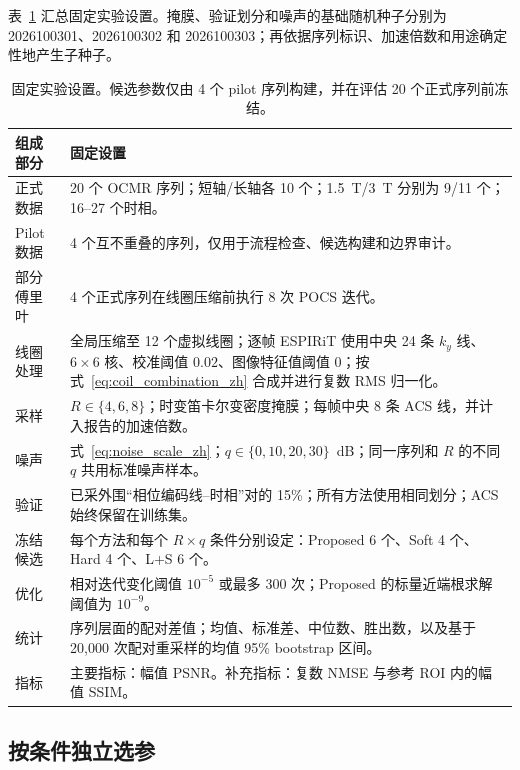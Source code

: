 表~\ref{tab:experimental_settings_zh} 汇总固定实验设置。掩膜、验证划分和噪声的基础随机种子分别为 2026100301、2026100302 和 2026100303；再依据序列标识、加速倍数和用途确定性地产生子种子。

\begin{table}[t]
\centering
\caption{固定实验设置。候选参数仅由 4 个 pilot 序列构建，并在评估 20 个正式序列前冻结。}
\label{tab:experimental_settings_zh}
\small
\renewcommand{\arraystretch}{1.08}
\begin{tabular}{p{}p{}}
\toprule
组成部分 & 固定设置 \\
\midrule
正式数据 & 20 个 OCMR 序列；短轴/长轴各 10 个；1.5~T/3~T 分别为 9/11 个；16--27 个时相。 \\
Pilot 数据 & 4 个互不重叠的序列，仅用于流程检查、候选构建和边界审计。 \\
部分傅里叶 & 4 个正式序列在线圈压缩前执行 8 次 POCS 迭代。 \\
线圈处理 & 全局压缩至 12 个虚拟线圈；逐帧 ESPIRiT 使用中央 24 条 $k_y$ 线、$6\times6$ 核、校准阈值 $0.02$、图像特征值阈值 0；按式~\eqref{eq:coil_combination_zh} 合成并进行复数 RMS 归一化。 \\
采样 & $R\in\{4,6,8\}$；时变笛卡尔变密度掩膜；每帧中央 8 条 ACS 线，并计入报告的加速倍数。 \\
噪声 & 式~\eqref{eq:noise_scale_zh}；$q\in\{0,10,20,30\}$~dB；同一序列和 $R$ 的不同 $q$ 共用标准噪声样本。 \\
验证 & 已采外围“相位编码线--时相”对的 15\%；所有方法使用相同划分；ACS 始终保留在训练集。 \\
冻结候选 & 每个方法和每个 $R\times q$ 条件分别设定：Proposed 6 个、Soft 4 个、Hard 4 个、L+S 6 个。 \\
优化 & 相对迭代变化阈值 $10^{-5}$ 或最多 300 次；Proposed 的标量近端根求解阈值为 $10^{-9}$。 \\
统计 & 序列层面的配对差值；均值、标准差、中位数、胜出数，以及基于 20,000 次配对重采样的均值 95\% bootstrap 区间。 \\
指标 & 主要指标：幅值 PSNR。补充指标：复数 NMSE 与参考 ROI 内的幅值 SSIM。 \\
\bottomrule
\end{tabular}
\end{table}

\subsection{按条件独立选参}
\label{sec:parameter_selection_zh}

